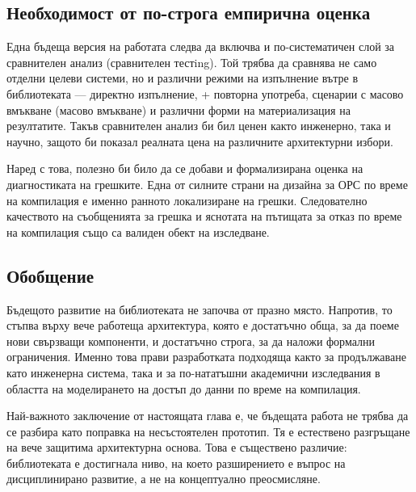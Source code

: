 \subsection{Необходимост от по-строга емпирична оценка}

Една бъдеща версия на работата следва да включва и по-систематичен слой за сравнителен анализ (сравнителен тестing). Той трябва да сравнява не само отделни целеви системи, но и различни режими на изпълнение вътре в библиотеката --- директно изпълнение,  + повторна употреба, сценарии с масово вмъкване (масово вмъкване) и различни форми на материализация на резултатите. Такъв сравнителен анализ би бил ценен както инженерно, така и научно, защото би показал реалната цена на различните архитектурни избори.

Наред с това, полезно би било да се добави и формализирана оценка на диагностиката на грешките. Една от силните страни на дизайна за ОРС по време на компилация е именно ранното локализиране на грешки. Следователно качеството на съобщенията за грешка и яснотата на пътищата за отказ по време на компилация също са валиден обект на изследване.

\subsection{Обобщение}

Бъдещото развитие на библиотеката не започва от празно място. Напротив, то стъпва върху вече работеща архитектура, която е достатъчно обща, за да поеме нови свързващи компоненти, и достатъчно строга, за да наложи формални ограничения. Именно това прави разработката подходяща както за продължаване като инженерна система, така и за по-нататъшни академични изследвания в областта на моделирането на достъп до данни по време на компилация.

Най-важното заключение от настоящата глава е, че бъдещата работа не трябва да се разбира като поправка на несъстоятелен прототип. Тя е естествено разгръщане на вече защитима архитектурна основа. Това е съществено различие: библиотеката е достигнала ниво, на което разширението е въпрос на дисциплинирано развитие, а не на концептуално преосмисляне.
